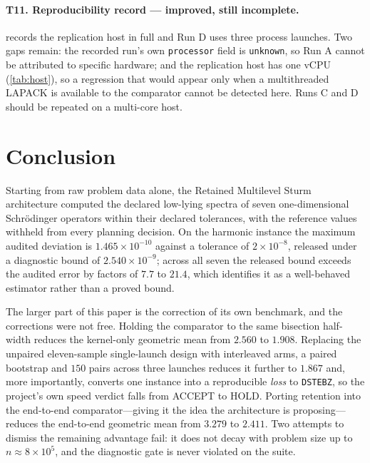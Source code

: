 \documentclass[twocolumn,10pt,a4paper]{article}
\theoremstyle{plain}
\theoremstyle{definition}
\newcommand{\ACCEPT}{\textsf{ACCEPT}}
\newcommand{\HOLD}{\textsf{HOLD}}
\begin{document}
\paragraph{T11. Reproducibility record --- \textbf{improved, still incomplete}.}
 records the replication host in full and Run D uses three
process launches. Two gaps remain: the recorded run's own \texttt{processor}
field is \texttt{unknown}, so Run A cannot be attributed to specific hardware;
and the replication host has one vCPU (\cref{tab:host}), so a regression that
would appear only when a multithreaded LAPACK is available to the comparator
cannot be detected here. Runs C and D should be repeated on a multi-core host.

\section{Conclusion}
\label{sec:conclusion}

Starting from raw problem data alone, the Retained Multilevel Sturm architecture
computed the declared low-lying spectra of seven one-dimensional Schr\"odinger
operators within their declared tolerances, with the reference values withheld
from every planning decision. On the harmonic instance the maximum audited
deviation is $1.465\times10^{-10}$ against a tolerance of $2\times10^{-8}$,
released under a diagnostic bound of $2.540\times10^{-9}$; across all seven the
released bound exceeds the audited error by factors of $7.7$ to $21.4$, which
identifies it as a well-behaved estimator rather than a proved bound.

The larger part of this paper is the correction of its own benchmark, and the
corrections were not free. Holding the comparator to the same bisection
half-width reduces the kernel-only geometric mean from $2.560$ to $1.908$.
Replacing the unpaired eleven-sample single-launch design with interleaved arms,
a paired bootstrap and $150$ pairs across three launches reduces it further to
$1.867$ and, more importantly, converts one instance into a reproducible
\emph{loss} to \texttt{DSTEBZ}, so the project's own speed verdict falls from
\ACCEPT{} to \HOLD{}. Porting retention into the end-to-end comparator---giving
it the idea the architecture is proposing---reduces the end-to-end geometric
mean from $3.279$ to $2.411$. Two attempts to dismiss the remaining advantage
fail: it does not decay with problem size up to $n \approx 8\times10^{5}$, and
the diagnostic gate is never violated on the suite.
\end{document}
